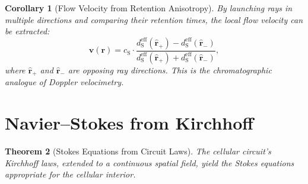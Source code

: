 \documentclass[11pt,twocolumn,a4paper]{article}
\newtheorem{theorem}{Theorem}[section]
\newtheorem{corollary}[theorem]{Corollary}
\newcommand{\dS}{d_{\mathrm{S}}}
\newcommand{\cS}{c_{\mathrm{S}}}
\begin{document}
\begin{corollary}[Flow Velocity from Retention Anisotropy]
\label{cor:flow-velocity}
By launching rays in multiple directions and comparing their retention
times, the local flow velocity can be extracted:
\begin{equation}
\mathbf{v}(\mathbf{r}) = \cS \cdot \frac{\dS^{\mathrm{eff}}
  (\hat{\mathbf{r}}_+) - \dS^{\mathrm{eff}}(\hat{\mathbf{r}}_-)}
  {\dS^{\mathrm{eff}}(\hat{\mathbf{r}}_+) +
  \dS^{\mathrm{eff}}(\hat{\mathbf{r}}_-)},
\label{eq:flow-from-retention}
\end{equation}
where $\hat{\mathbf{r}}_+$ and $\hat{\mathbf{r}}_-$ are opposing ray
directions. This is the chromatographic analogue of Doppler
velocimetry.
\end{corollary}


\section{Navier--Stokes from Kirchhoff}
\label{sec:navier-stokes}

\begin{theorem}[Stokes Equations from Circuit Laws]
\label{thm:stokes-from-kirchhoff}
The cellular circuit's Kirchhoff laws, extended to a continuous spatial
field, yield the Stokes equations appropriate for the cellular interior.
\end{theorem}
\end{document}
